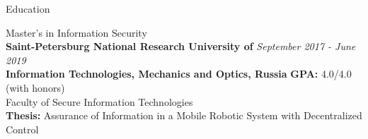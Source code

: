 \documentclass[10pt]{resume} %
\begin{document}
\begin{rSection}{Education}

\vspace{-0.3cm}
Master's in Information Security \\
{\bf Saint-Petersburg National Research University of} \hfill \small{\em September 2017 - June 2019}\normalsize\\ \textbf{Information Technologies, Mechanics and Optics, Russia} \hfill \small\textbf{GPA:} 4.0/4.0 (with honors)\normalsize   
\\ Faculty of Secure Information Technologies\\
\textbf{Thesis:} Assurance of Information in a Mobile Robotic System with Decentralized Control\\

\end{rSection}
\end{document}
